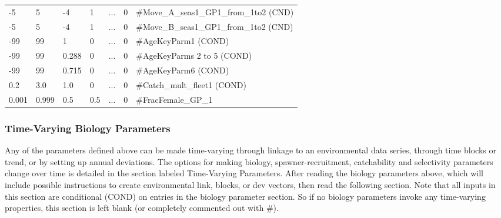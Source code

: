 \begin{center}
\begin{longtable}{p{1.1cm} p{1.1cm} p{1.1cm}  p{1.1cm}  p{1.1cm}  p{1.1cm}  p{8cm}  }
		-5   & 5    & -4   & 1    & ... & 0 & \#Move\_A\_seas1\_GP1\_from\_1to2 (CND)\\
        -5   & 5    & -4   & 1    & ... & 0 & \#Move\_B\_seas1\_GP1\_from\_1to2 (CND)\\
		-99  & 99   &  1   & 0    & ... & 0 & \#AgeKeyParm1 (COND)\\
		-99  & 99   &  0.288   & 0    & ... & 0 & \#AgeKeyParms 2 to 5 (COND)\\
		-99  & 99   &  0.715   & 0    & ... & 0 & \#AgeKeyParm6 (COND)\\	
		0.2  & 3.0   &  1.0   & 0    & ... & 0 & \#Catch\_mult\_fleet1 (COND)\\
		0.001 & 0.999 & 0.5 & 0.5    & ... & 0 & \#FracFemale\_GP\_1 \\		
		\hline
	\end{longtable}
\end{center}

\hypertarget{tvOrder}{}
\subsubsection{Time-Varying Biology Parameters}
Any of the parameters defined above can be made time-varying through linkage to an environmental data series, through time blocks or trend, or by setting up annual deviations.  The options for making biology, spawner-recruitment,  catchability and selectivity parameters change over time is detailed in the section labeled Time-Varying Parameters.  After reading the biology parameters above, which will include possible instructions to create environmental link, blocks, or dev vectors, then read the following section.  Note that all inputs in this section are conditional (COND) on entries in the biology parameter section.  So if no biology parameters invoke any time-varying properties, this section is left blank (or completely commented out with \#).

